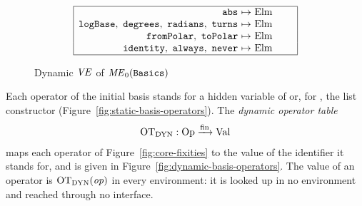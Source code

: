 \begin{figure}[htbp]
\[\begin{array}{|r@{\ }c@{\ }l@{\qquad}c|}
\hline
\kw{abs}\citealso{b:Basics.abs} & \mapsto & \text{Elm} & \\
\kw{logBase}\citealso{b:Basics.logBase},\ \kw{degrees}\citealso{b:Basics.degrees},\ \kw{radians}\citealso{b:Basics.radians},\ \kw{turns}\citealso{b:Basics.turns} & \mapsto & \text{Elm} & \\
\kw{fromPolar}\citealso{b:Basics.fromPolar},\ \kw{toPolar}\citealso{b:Basics.toPolar} & \mapsto & \text{Elm} & \\
\kw{identity}\citealso{b:Basics.identity},\ \kw{always}\citealso{b:Basics.always},\ \kw{never}\citealso{b:Basics.never} & \mapsto & \text{Elm} & \\
\hline
\end{array}
\]
\caption{Dynamic $\mathit{VE}$ of $\mathit{ME}_0(\textnormal{\texttt{Basics}})$}\label{fig:dynamic-basis-basics}
\end{figure}

Each operator of the initial basis stands for a hidden variable of
 or, for \kw{::}, the list constructor
(Figure~\ref{fig:static-basis-operators}). The \emph{dynamic operator table}
\[
  \mathrm{OT}_{\mathrm{DYN}} : \mathrm{Op} \xrightarrow{\mathrm{fin}} \mathrm{Val}
\]
maps each operator of Figure~\ref{fig:core-fixities} to the value of the
identifier it stands for, and is given in
Figure~\ref{fig:dynamic-basis-operators}. The value of an operator is
$\mathrm{OT}_{\mathrm{DYN}}(\mathit{op})$ in every environment: it is looked up in no environment and
reached through no interface. %

